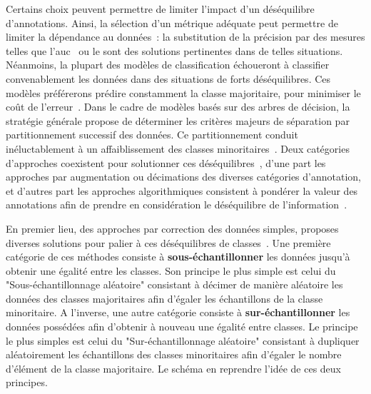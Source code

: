 Certains choix peuvent permettre de limiter l'impact d'un déséquilibre d'annotations. Ainsi, la sélection d'un métrique adéquate peut permettre de limiter la dépendance au données~: la substitution de la précision par des mesures telles que l'\gls{auc}~\cite{Celebi2007} ou le \fscore{} sont des solutions pertinentes dans de telles situations. Néanmoins, la plupart des modèles de classification échoueront à classifier convenablement les données dans des situations de forts déséquilibres. Ces modèles préférerons prédire constamment la classe majoritaire, pour minimiser le coût de l'erreur~\cite{Huang2013}. Dans le cadre de modèles basés sur des arbres de décision, la stratégie générale propose de déterminer les critères majeurs de séparation par partitionnement successif des données. Ce partitionnement conduit inéluctablement à un affaiblissement des classes minoritaires~\cite{He2009}. Deux catégories d'approches coexistent pour solutionner ces déséquilibres~\cite{Huang2013}, d'une part les approches par augmentation ou décimations des diverses catégories d'annotation, et d'autres part les approches algorithmiques consistent à pondérer la valeur des annotations afin de prendre en considération le déséquilibre de l'information~\cite{Ting2002,He2009,Thai2010}.\par

En premier lieu, des approches par correction des données simples, proposes diverses solutions pour palier à ces déséquilibres de classes~\cite{Prati2009, He2009}. Une première catégorie de ces méthodes consiste à \textbf{sous-échantillonner} les données jusqu'à obtenir une égalité entre les classes. Son principe le plus simple est celui du "Sous-échantillonnage aléatoire" consistant à décimer de manière aléatoire les données des classes majoritaires afin d'égaler les échantillons de la classe minoritaire. A l'inverse, une autre catégorie consiste à \textbf{sur-échantillonner} les données possédées afin d'obtenir à nouveau une égalité entre classes. Le principe le plus simples est celui du "Sur-échantillonnage aléatoire" consistant à dupliquer aléatoirement les échantillons des classes minoritaires afin d'égaler le nombre d'élément de la classe majoritaire. Le schéma en  reprendre l'idée de ces deux principes.\par

